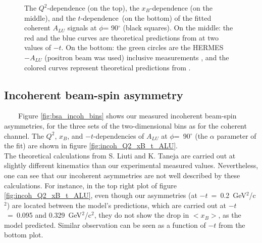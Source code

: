 \begin{figure}[tpb]
\caption{The $Q^{2}$-dependence (on the top), the $x_{B}$-dependence (on the 
   middle), and the $t$-dependence~(on the bottom) of the fitted coherent 
   $A_{LU}$ signals at $\phi$= 90$^{\circ}$ (black squares). On the middle: the red and the 
   blue curves are theoretical predictions from \cite{simonetta_2} at two 
values of $-t$. On the bottom: the green circles are the HERMES $-A_{LU}$ 
(positron beam was used) inclusive measurements \cite{HERMES_BSA}, and the 
colored curves represent theoretical predictions from \cite{simonetta_2}.} 
\label{fig:coh_Q2_xB_t_ALU}
\end{figure}


\subsection{Incoherent beam-spin asymmetry}
~~~~Figure \ref{fig:bsa_incoh_bins} shows our measured incoherent beam-spin 
asymmetries, for the three sets of the two-dimensional bins as for the coherent 
channel. The $Q^2$, $x_{B}$, and $-t$-dependencies of $A_{LU}$ at 
$\phi$=~90$^{\circ}$ (the $\alpha$ parameter of the fit) are shown in figure 
\ref{fig:incoh_Q2_xB_t_ALU}.\\

The theoretical calculations from S. Liuti and K. Taneja are carried out at slightly different kinematics than our experimental measured values. Nevertheless, one can see that our incoherent asymmetries are not well described by these calculations. For instance, in the top right plot of figure \ref{fig:incoh_Q2_xB_t_ALU}, even though our asymmetries (at $-t$~=~0.2~GeV$^2$/c$^2$) are located between the model's predictions, which are carried out at $-t$~=~0.095 and 0.329~GeV$^2$/c$^2$, they do not show the drop in $<x_B>$, as the model predicted. Similar observation can be seen as a function of $-t$ from the bottom plot.

